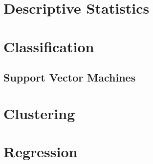 \section{Descriptive Statistics}



\section{Classification}



\subsection{Support Vector Machines}











\section{Clustering}



\section{Regression}











